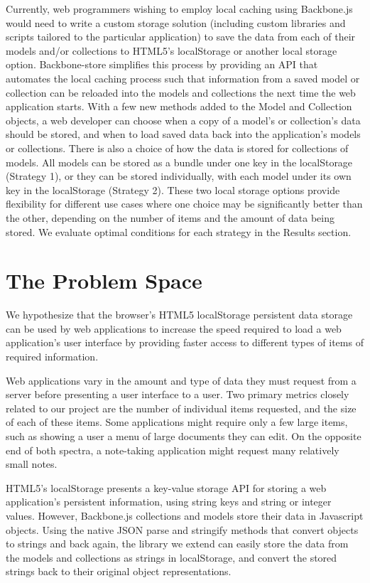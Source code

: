 \documentclass[12pt]{article}
\begin{document}
Currently, web programmers wishing to employ local caching using Backbone.js would need to write a custom storage solution (including custom libraries and scripts tailored to the particular application) to save the data from each of their models and/or collections to HTML5's localStorage or another local storage option. Backbone-store simplifies this process by providing an API that automates the local caching process such that information from a saved model or collection can be reloaded into the
models and collections the next time the web application starts. With a few new
methods added to the Model and Collection objects, a web developer can choose
when a copy of a model's or collection's data should be stored, and when to
load saved data back into the application's models or collections. There is
also a choice of how the data is stored for collections of models. All models
can be stored as a bundle under one key in the localStorage (Strategy 1), or they can be
stored individually, with each model under its own key in the localStorage (Strategy 2).
These two local storage options provide flexibility for different use cases where one choice may be
significantly better than the other, depending on the number of items and
the amount of data being stored. We evaluate optimal conditions for each strategy in the Results section.

\section{The Problem Space}

We hypothesize that the browser's HTML5 localStorage persistent data storage
can be used by web applications to increase the speed required to load a web
application's user interface by providing faster access to different types of
items of required information.

Web applications vary in the amount and type of data they must request from a
server before presenting a user interface to a user. Two primary metrics
closely related to our project are the number of individual items requested,
and the size of each of these items. Some applications might require only a few
large items, such as showing a user a menu of large documents they can edit. On
the opposite end of both spectra, a note-taking application might request many
relatively small notes.

HTML5's localStorage presents a key-value storage API for storing a web
application's persistent information, using string keys and string or integer
values. However, Backbone.js collections and models store their data in
Javascript objects. Using the native JSON parse and stringify methods that
convert objects to strings and back again, the library we extend can easily
store the data from the models and collections as strings in localStorage, and
convert the stored strings back to their original object representations.
\end{document}
